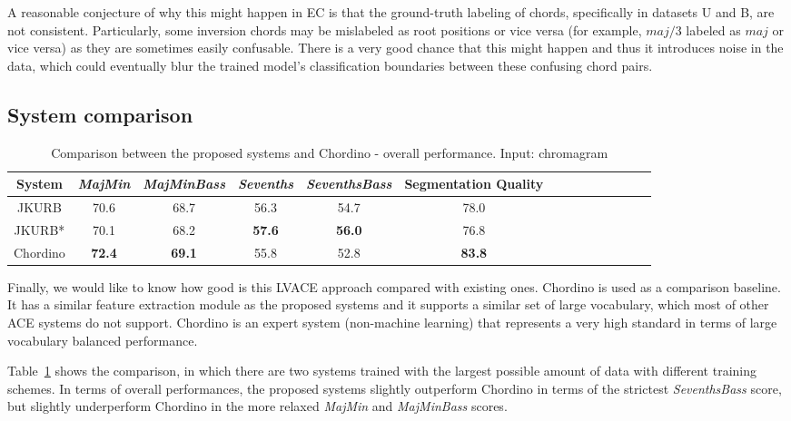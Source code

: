 A reasonable conjecture of why this might happen in EC is that the ground-truth labeling of chords, specifically in datasets U and B, are not consistent. Particularly, some inversion chords may be mislabeled as root positions or vice versa (for example, $maj/3$ labeled as $maj$ or vice versa) as they are sometimes easily confusable. There is a very good chance that this might happen and thus it introduces noise in the data, which could eventually blur the trained model's classification boundaries between these confusing chord pairs.


\subsection{System comparison}

\begin{table}[htb]
	\caption{Comparison between the proposed systems and Chordino - overall performance. Input: chromagram}
	\label{tab:4-cpcd}
	\centering
	\scriptsize
	\begin{tabular}{|c|c|c|c|c|c|c|c|c|c|c|c|c|c|}\hline
		System & \textit{MajMin} & \textit{MajMinBass} & \textit{Sevenths} & \textbf{\textit{SeventhsBass}} & Segmentation Quality\\ \hline
		JKURB & 70.6 & 68.7 & 56.3 & 54.7 & 78.0\\ \hline
		JKURB* & 70.1 & 68.2 & \textbf{57.6} & \textbf{56.0} & 76.8\\ \hline
		Chordino & \textbf{72.4} & \textbf{69.1} & 55.8 & 52.8 & \textbf{83.8}\\ \hline
	\end{tabular}
\end{table}

Finally, we would like to know how good is this LVACE approach compared with existing ones. Chordino\cite{cannam2013mirex} is used as a comparison baseline. It has a similar feature extraction module as the proposed systems and it supports a similar set of large vocabulary, which most of other ACE systems do not support. Chordino is an expert system (non-machine learning) that represents a very high standard \cite{deng2016chord} in terms of large vocabulary balanced performance.

Table~\ref{tab:4-cpcd} shows the comparison, in which there are two systems trained with the largest possible amount of data with different training schemes. In terms of overall performances, the proposed systems slightly outperform Chordino in terms of the strictest \textit{SeventhsBass} score, but slightly underperform Chordino in the more relaxed \textit{MajMin} and \textit{MajMinBass} scores.

